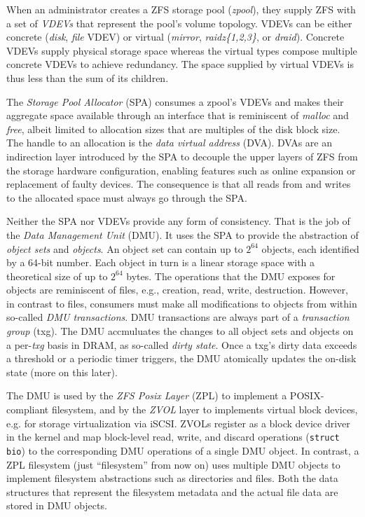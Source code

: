 \documentclass[12pt,a4paper,twoside]{book}
\begin{document}
When an administrator creates a ZFS storage pool (\textit{zpool}), they supply ZFS with a set of \textit{VDEVs} that represent the pool's volume topology.
VDEVs can be either concrete (\textit{disk}, \textit{file} VDEV) or virtual (\textit{mirror}, \textit{raidz\{1,2,3\}}, or \textit{draid}).
Concrete VDEVs supply physical storage space whereas the virtual types compose multiple concrete VDEVs to achieve redundancy.
The space supplied by virtual VDEVs is thus less than the sum of its children.

The \textit{Storage Pool Allocator} (SPA) consumes a zpool's VDEVs and makes their aggregate space available through an interface that is reminiscent of \textit{malloc} and \textit{free}, albeit limited to allocation sizes that are multiples of the disk block size.
The handle to an allocation is the \textit{data virtual address} (DVA).
DVAs are an indirection layer introduced by the SPA to decouple the upper layers of ZFS from the storage hardware configuration, enabling features such as online expansion or replacement of faulty devices.
The consequence is that all reads from and writes to the allocated space must always go through the SPA.

Neither the SPA nor VDEVs provide any form of consistency.
That is the job of the \textit{Data Management Unit} (DMU).
It uses the SPA to provide the abstraction of \textit{object sets} and \textit{objects}.
An object set can contain up to $2^{64}$ objects, each identified by a 64-bit number.
Each object in turn is a linear storage space with a theoretical size of up to $2^{64}$ bytes.
The operations that the DMU exposes for objects are reminiscent of files, e.g., creation, read, write, destruction.
However, in contrast to files, consumers must make all modifications to objects from within so-called \textit{DMU transactions}.
DMU transactions are always part of a \textit{transaction group} (txg).
The DMU accmuluates the changes to all object sets and objects on a per-\textit{txg} basis in DRAM, as so-called \textit{dirty state}.
Once a txg's dirty data exceeds a threshold or a periodic timer triggers, the DMU atomically updates the on-disk state (more on this later).

The DMU is used by the \textit{ZFS Posix Layer} (ZPL) to implement a POSIX-compliant filesystem, and by the \textit{ZVOL} layer to implements virtual block devices, e.g. for storage virtualization via iSCSI.
ZVOLs register as a block device driver in the kernel and map block-level read, write, and discard operations (\lstinline[style=figurepseudocode]{struct bio}) to the corresponding DMU operations of a single DMU object.
In contrast, a ZPL filesystem (just ``filesystem'' from now on) uses multiple DMU objects to implement filesystem abstractions such as directories and files.
Both the data structures that represent the filesystem metadata and the actual file data are stored in DMU objects.
\end{document}

